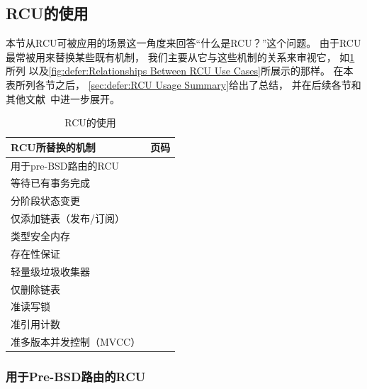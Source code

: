 
\subsection{RCU的使用}
\label{sec:defer:RCU Usage}

本节从RCU可被应用的场景这一角度来回答``什么是RCU？''这个问题。
由于RCU最常被用来替换某些既有机制，
我们主要从它与这些机制的关系来审视它，
如\cref{tab:defer:RCU Usage}所列
以及\cref{fig:defer:Relationships Between RCU Use Cases}所展示的那样。
在本表所列各节之后，
\cref{sec:defer:RCU Usage Summary}给出了总结，
并在后续各节和其他文献~\cite{PaulEMcKenney2021RCUMysteriesFundamental,PaulEMcKenney2022RCUMysteriesUseCases}中进一步展开。

\begin{table}
\renewcommand*{\arraystretch}{1.2}
\centering
\small
\begin{tabular}{ll}
\toprule
RCU所替换的机制 & 页码 \\
\midrule
用于pre-BSD路由的RCU &
	\pageref{sec:defer:RCU for Pre-BSD Routing} \\
等待已有事务完成 &
	\pageref{sec:defer:Wait for Pre-Existing Things to Finish} \\
分阶段状态变更 &
	\pageref{sec:defer:Phased State Change} \\
仅添加链表（发布/订阅） &
	\pageref{sec:defer:Add-Only List} \\
类型安全内存 &
	\pageref{sec:defer:Type-Safe Memory} \\
存在性保证 &
	\pageref{sec:defer:Existence Guarantee} \\
轻量级垃圾收集器 &
	\pageref{sec:defer:Light-Weight Garbage Collector} \\
仅删除链表 &
	\pageref{sec:defer:Delete-Only List} \\
准读写锁 &
	\pageref{sec:defer:Quasi Reader-Writer Lock} \\
准引用计数 &
	\pageref{sec:defer:Quasi Reference Count} \\
准多版本并发控制（MVCC） &
	\pageref{sec:defer:Quasi Multi-Version Concurrency Control} \\
\bottomrule
\end{tabular}
\caption{RCU的使用}
\label{tab:defer:RCU Usage}
\end{table}

\subsubsection{用于Pre-BSD路由的RCU}
\label{sec:defer:RCU for Pre-BSD Routing}

